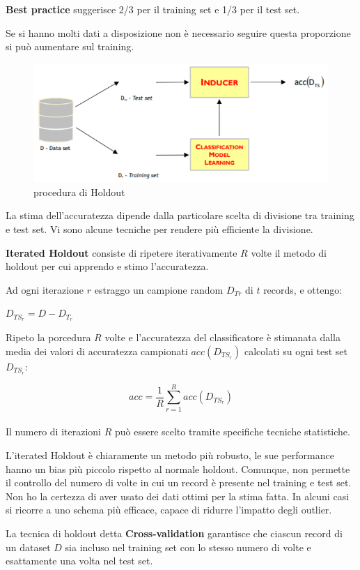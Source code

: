 \textbf{Best practice} suggerisce 2/3 per il training set e 1/3 per il test set.

Se si hanno molti dati a disposizione non \`e necessario seguire questa proporzione si pu\`o aumentare sul training.\\

\begin{figure}[H]
	\centering
	\includegraphics[height=0.3 \linewidth]{classification/pict/holdout.png}
	\caption{procedura di Holdout}
\end{figure}

La stima dell'accuratezza dipende dalla particolare scelta di divisione tra training e test set. Vi sono alcune tecniche per rendere più efficiente la divisione.

\begin{defn}
	\textbf{Iterated Holdout} consiste di ripetere iterativamente $R$ volte il metodo di holdout per cui apprendo e stimo l'accuratezza. 
\end{defn}
Ad ogni iterazione $r$ estraggo un campione random $D_{Tr}$ di $t$ records, e ottengo: 
	
$D_{TS_r} = D - D_{T_r}$
	
Ripeto la porcedura $R$ volte e l'accuratezza del classificatore è stimanata dalla media dei valori di accuratezza campionati $acc(D_{TS_r})$ calcolati su ogni test set $D_{TS_r}$:
	
\[ acc = \frac{1}{R} \sum_{r=1}^{R}acc(D_{TS_r})\]\\
	
Il numero di iterazioni $R$ può essere scelto tramite specifiche tecniche statistiche.

L'iterated Holdout è chiaramente un metodo pi\`u robusto, le sue performance hanno un bias più piccolo rispetto al normale holdout. Comunque, non permette il controllo del numero di volte in cui un record è presente nel training e test set. Non ho la certezza di aver usato dei dati ottimi per la stima fatta. In alcuni casi si ricorre a uno schema più efficace, capace di ridurre l'impatto degli outlier. 

\begin{defn}
	La tecnica di holdout detta	\textbf{Cross-validation} garantisce che ciascun record di un dataset $D$ sia incluso nel training set con lo stesso numero di volte e esattamente una volta nel test set. 
\end{defn}

